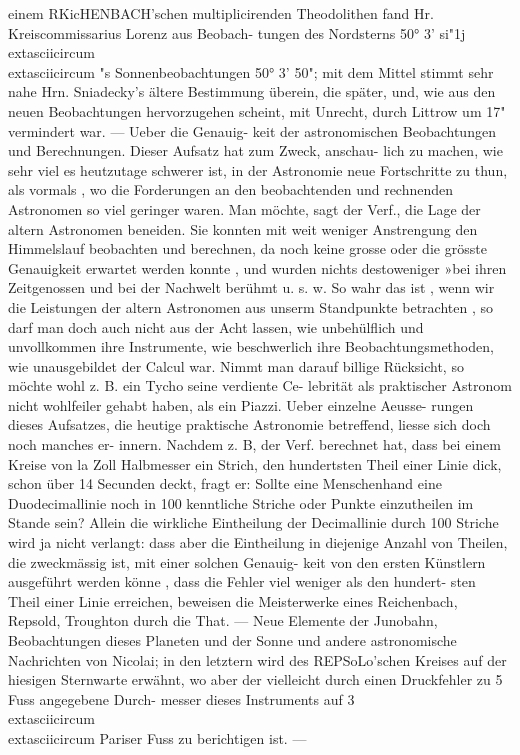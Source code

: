 \documentclass[12pt,a4paper]{article}
\begin{document}
{{{{{{{{einem  RKicHENBACH'schen  multiplicirenden  Theodolithen  fand  Hr.  Kreiscommissarius  Lorenz  aus  Beobach- tungen des  Nordsterns  50°  3'  si"1j  \\	extasciicircum{}{ }{ }\\	extasciicircum{}{ }{ }"s  Sonnenbeobachtungen  50°  3'  50";  mit  dem  Mittel  stimmt  sehr nahe  Hrn.  Sniadecky's  ältere  Bestimmung  überein,  die  später,  und,  wie  aus  den  neuen  Beobachtungen hervorzugehen  scheint,  mit  Unrecht,  durch  Littrow  um  17"  vermindert  war.  ---  Ueber  die  Genauig- keit der  astronomischen  Beobachtungen  und  Berechnungen.  Dieser  Aufsatz  hat  zum  Zweck,  anschau- lich zu  machen,  wie  sehr  viel  es  heutzutage  schwerer  ist,  in  der  Astronomie  neue  Fortschritte  zu  thun, als  vormals ,  wo  die  Forderungen  an  den  beobachtenden  und  rechnenden  Astronomen  so  viel  geringer waren.  Man  möchte,  sagt  der  Verf.,  die  Lage  der  altern  Astronomen  beneiden.  Sie  konnten  mit  weit weniger  Anstrengung  den  Himmelslauf  beobachten  und  berechnen,  da  noch  keine  grosse  oder  die  grösste Genauigkeit  erwartet  werden  konnte ,  und  wurden  nichts  destoweniger  »bei  ihren  Zeitgenossen  und  bei der  Nachwelt  berühmt  u.  s.  w.  So  wahr  das  ist ,  wenn  wir  die  Leistungen  der  altern  Astronomen  aus unserm  Standpunkte  betrachten ,  so  darf  man  doch  auch  nicht  aus  der  Acht  lassen,  wie  unbehülflich  und unvollkommen  ihre  Instrumente,  wie  beschwerlich  ihre  Beobachtungsmethoden,  wie  unausgebildet  der Calcul  war.  Nimmt  man  darauf  billige  Rücksicht,  so  möchte  wohl  z.  B.  ein  Tycho  seine  verdiente  Ce- lebrität  als  praktischer  Astronom  nicht  wohlfeiler  gehabt  haben,  als  ein  Piazzi.  Ueber  einzelne  Aeusse- rungen  dieses  Aufsatzes,  die  heutige  praktische  Astronomie  betreffend,  liesse  sich  doch  noch  manches  er- innern. Nachdem  z.  B,  der  Verf.  berechnet  hat,  dass  bei  einem  Kreise  von  la  Zoll  Halbmesser  ein Strich,  den  hundertsten  Theil  einer  Linie  dick,  schon  über  14  Secunden  deckt,  fragt  er:  Sollte  eine Menschenhand  eine  Duodecimallinie  noch  in  100  kenntliche  Striche  oder  Punkte  einzutheilen  im  Stande sein?  Allein  die  wirkliche  Eintheilung  der  Decimallinie  durch  100  Striche  wird  ja  nicht  verlangt:  dass aber  die  Eintheilung  in  diejenige  Anzahl  von  Theilen,  die  zweckmässig  ist,  mit  einer  solchen  Genauig- keit von  den  ersten  Künstlern  ausgeführt  werden  könne ,  dass  die  Fehler  viel  weniger  als  den  hundert- sten Theil  einer  Linie  erreichen,  beweisen  die  Meisterwerke  eines  Reichenbach,  Repsold,  Troughton durch  die  That.  ---  Neue  Elemente  der  Junobahn,  Beobachtungen  dieses  Planeten  und  der  Sonne  und andere  astronomische  Nachrichten  von  Nicolai;  in  den  letztern  wird  des  REPSoLo'schen  Kreises  auf  der hiesigen  Sternwarte  erwähnt,  wo  aber  der  vielleicht  durch  einen  Druckfehler  zu  5  Fuss  angegebene  Durch- messer dieses  Instruments  auf  3\\	extasciicircum{}{ }{ }\\	extasciicircum{}{ }{ }  Pariser  Fuss  zu  berichtigen  ist.  ---  }}}}}}}}
\end{document}
